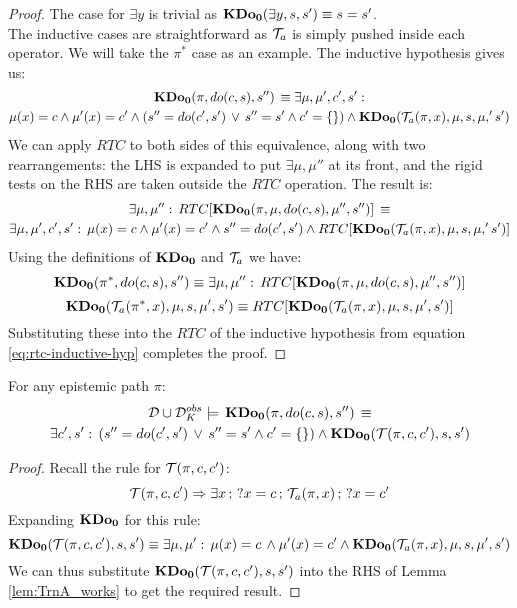 \begin{proof}
The case for $\exists y$ is trivial as $\mathbf{KDo_{0}}(\exists y,s,s')\equiv s=s'$.\\


The inductive cases are straightforward as $\mathcal{T}_{a}$ is simply pushed
inside each operator. We will take the $\pi^{*}$ case as an example.
The inductive hypothesis gives us:\begin{multline*}
\mathbf{KDo_{0}}(\pi,do(c,s),s'')\,\equiv\exists\mu,\mu',c',s':\\
\mu(x)=c\wedge\mu'(x)=c'\wedge\left(s''=do(c',s')\,\vee\, s''=s'\wedge c'=\{\}\right)\wedge\mathbf{KDo_{0}}(\mathcal{T}_{a}(\pi,x),\mu,s,\mu,'s')\end{multline*}
 We can apply $RTC$ to both sides of this equivalence, along with
two rearrangements: the LHS is expanded to put $\exists\mu,\mu''$
at its front, and the rigid tests on the RHS are taken outside the
$RTC$ operation. The result is:\begin{multline}
\exists\mu,\mu'':\, RTC[\mathbf{KDo_{0}}(\pi,\mu,do(c,s),\mu'',s'')]\,\equiv\\
\exists\mu,\mu',c',s':\,\mu(x)=c\wedge\mu'(x)=c'\wedge s''=do(c',s')\wedge RTC[\mathbf{KDo_{0}}(\mathcal{T}_{a}(\pi,x),\mu,s,\mu,'s')]\label{eq:rtc-inductive-hyp}\end{multline}
 Using the definitions of $\mathbf{KDo_{0}}$ and $\mathcal{T}_{a}$ we have:\[
\mathbf{KDo_{0}}(\pi^{*},do(c,s),s'')\equiv\exists\mu,\mu'':\, RTC[\mathbf{KDo_{0}}(\pi,\mu,do(c,s),\mu'',s'')]\]
 \[
\mathbf{KDo_{0}}(\mathcal{T}_{a}(\pi^{*},x),\mu,s,\mu',s')\equiv RTC[\mathbf{KDo_{0}}(\mathcal{T}_{a}(\pi,x),\mu,s,\mu',s')]\]
 Substituting these into the $RTC$ of the inductive hypothesis from
equation \eqref{eq:rtc-inductive-hyp} completes the proof. 
\end{proof}
\medskip{}


\begin{thmext}
[{{[}{\ref{thm:Trn-respects-epi-paths}}]}] For any epistemic path
$\pi$:\begin{multline*}
\mathcal{D}\cup\mathcal{D}_{K}^{obs}\models\,\mathbf{KDo_{0}}(\pi,do(c,s),s'')\,\equiv\\
\exists c',s':\,\left(s''=do(c',s')\,\vee\, s''=s'\wedge c'=\{\}\right)\wedge\mathbf{KDo_{0}}(\mathcal{T}(\pi,c,c'),s,s')\end{multline*}

\end{thmext}
\begin{proof}
Recall the rule for $\mathcal{T}(\pi,c,c')$:\[
\mathcal{T}(\pi,c,c')\Rightarrow\exists x\,;\,?x=c\,;\,\mathcal{T}_{a}(\pi,x)\,;\,?x=c'\]
 Expanding $\mathbf{KDo_{0}}$ for this rule:\[
\mathbf{KDo_{0}}(\mathcal{T}(\pi,c,c'),s,s')\equiv\exists\mu,\mu':\,\mu(x)=c\,\wedge\mu'(x)=c'\wedge\mathbf{KDo_{0}}(\mathcal{T}_{a}(\pi,x),\mu,s,\mu',s')\]
 We can thus substitute $\mathbf{KDo_{0}}(\mathcal{T}(\pi,c,c'),s,s')$ into the RHS
of Lemma \ref{lem:TrnA_works} to get the required result. 
\end{proof}
\medskip{}


